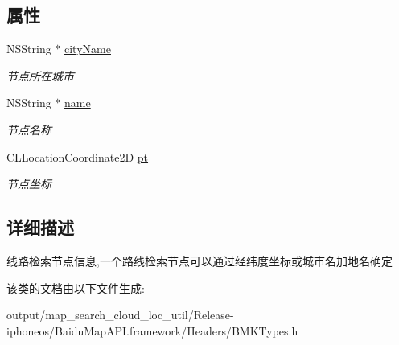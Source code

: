 \subsection*{属性}
\begin{DoxyCompactItemize}
\item 
\hypertarget{interface_b_m_k_plan_node_ae6181a2e46740e8422a0b0820eedd0bb}{}N\+S\+String $\ast$ \hyperlink{interface_b_m_k_plan_node_ae6181a2e46740e8422a0b0820eedd0bb}{city\+Name}\label{interface_b_m_k_plan_node_ae6181a2e46740e8422a0b0820eedd0bb}

\begin{DoxyCompactList}\small\item\em 节点所在城市 \end{DoxyCompactList}\item 
\hypertarget{interface_b_m_k_plan_node_afe487565841e6361610e53d77af75f65}{}N\+S\+String $\ast$ \hyperlink{interface_b_m_k_plan_node_afe487565841e6361610e53d77af75f65}{name}\label{interface_b_m_k_plan_node_afe487565841e6361610e53d77af75f65}

\begin{DoxyCompactList}\small\item\em 节点名称 \end{DoxyCompactList}\item 
\hypertarget{interface_b_m_k_plan_node_a1fa1ff65e104926cc145168df5261136}{}C\+L\+Location\+Coordinate2\+D \hyperlink{interface_b_m_k_plan_node_a1fa1ff65e104926cc145168df5261136}{pt}\label{interface_b_m_k_plan_node_a1fa1ff65e104926cc145168df5261136}

\begin{DoxyCompactList}\small\item\em 节点坐标 \end{DoxyCompactList}\end{DoxyCompactItemize}


\subsection{详细描述}
线路检索节点信息,一个路线检索节点可以通过经纬度坐标或城市名加地名确定 

该类的文档由以下文件生成\+:\begin{DoxyCompactItemize}
\item 
output/map\+\_\+search\+\_\+cloud\+\_\+loc\+\_\+util/\+Release-\/iphoneos/\+Baidu\+Map\+A\+P\+I.\+framework/\+Headers/B\+M\+K\+Types.\+h\end{DoxyCompactItemize}
